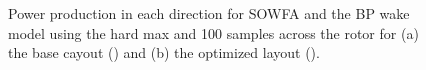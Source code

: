 \documentclass[conf]{new-aiaa}
\begin{document}
\begin{figure}[ht]
	\centering
	\caption{Power production in each direction for SOWFA and the BP wake model using the hard max and 100 samples across the rotor for (a) the base cayout () and (b) the optimized layout ().}
	\label{fig:dir-power}
\end{figure}
%
\end{document}
